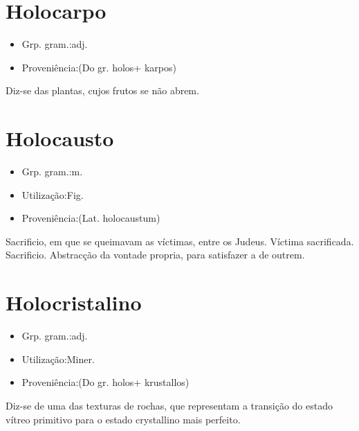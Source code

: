 \documentclass{article}
\begin{document}
\section{Holocarpo}
\begin{itemize}
\item {Grp. gram.:adj.}
\end{itemize}
\begin{itemize}
\item {Proveniência:(Do gr. \textunderscore holos\textunderscore  + \textunderscore karpos\textunderscore )}
\end{itemize}
Diz-se das plantas, cujos frutos se não abrem.
\section{Holocausto}
\begin{itemize}
\item {Grp. gram.:m.}
\end{itemize}
\begin{itemize}
\item {Utilização:Fig.}
\end{itemize}
\begin{itemize}
\item {Proveniência:(Lat. \textunderscore holocaustum\textunderscore )}
\end{itemize}
Sacrificio, em que se queimavam as víctimas, entre os Judeus.
Víctima sacrificada.
Sacrificio.
Abstracção da vontade propria, para satisfazer a de outrem.
\section{Holocristalino}
\begin{itemize}
\item {Grp. gram.:adj.}
\end{itemize}
\begin{itemize}
\item {Utilização:Miner.}
\end{itemize}
\begin{itemize}
\item {Proveniência:(Do gr. \textunderscore holos\textunderscore  + \textunderscore krustallos\textunderscore )}
\end{itemize}
Diz-se de uma das texturas de rochas, que representam a transição do estado vítreo primitivo para o estado crystallino mais perfeito.
\end{document}
